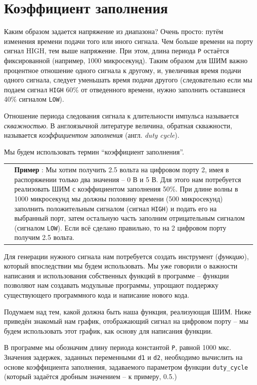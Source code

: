 \documentclass[a4paper,twoside]{book}
\newcounter{example-counter}
\newcommand{\example}[1]{
  \vspace{8pt}
  \begin{tabularx}{\textwidth}{m{1cm} m{9cm}}
    
    & \textbf{Пример \arabic{example-counter}}: #1 \\
  \end{tabularx}
  \addtocounter{example-counter}{1}
}
\begin{document}
\section{Коэффициент заполнения}

Каким образом задается напряжение из диапазона? Очень просто: путём изменения
времени подачи того или иного сигнала. Чем больше времени на порту сигнал HIGH,
тем выше напряжение. При этом, длина периода \texttt{P} остаётся фиксированной
(например, 1000 микросекунд). Таким образом для ШИМ важно процентное отношение
одного сигнала к другому, и, увеличивая время подачи одного сигнала, следует
уменьшать время подачи другого (следовательно если мы подаем сигнал
\texttt{HIGH} 60\% от отведенного времени, нужно заполнить оставшиеся 40\%
сигналом \texttt{LOW}).

Отношение периода следования сигнала к длительности импульса называется
\emph{скважностью}. В англоязычной литературе величина, обратная скважности,
называется \emph{коэффициентом заполнения} (англ. \emph{duty cycle}).

Мы будем использовать термин ``коэффициент заполнения''.

\example {
  Мы хотим получить 2.5 вольта на цифровом порту 2, имея в
  распоряжении только два значения -- 0 В и 5 В. Для этого нам потребуется
  реализовать ШИМ с коэффициентом заполнения 50\%. При длине волны в 1000
  микросекунд мы должны половину времени (500 микросекунд) заполнить
  положительным сигналом (сигнал \texttt{HIGH}) и подать его на выбранный порт, затем
  остальную часть заполним отрицательным сигналом (сигналом \texttt{LOW}).
  Если всё сделано правильно, то на 2 цифровом порту получим 2.5 вольта.
}

Для генерации нужного сигнала нам потребуется создать инструмент
(\emph{функцию}), который впоследствии мы будем использовать. Мы уже говорили о
важности написания и использования собственных функций в программе -- функции
позволяют нам создавать модульные программы, упрощают поддержку существующего
программного кода и написание нового кода.

Подумаем над тем, какой должна быть наша функция, реализующая ШИМ. Ниже приведён
знакомый нам график, отображающий сигнал на цифровом порту -- мы будем
использовать этот график, как основу для написания функции.


В программе мы обозначим длину периода константой \texttt{P}, равной 1000 мкс.
Значения задержек, заданных переменными \texttt{d1} и \texttt{d2}, необходимо
вычислить на основе коэффициента заполнения, задаваемого параметром функции
\texttt{duty\_cycle} (который задаётся дробным значением -- к примеру, 0.5.)
\end{document}
